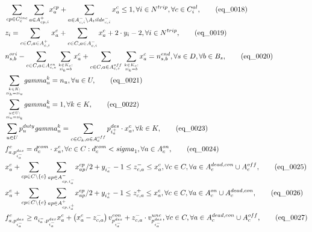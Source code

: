 \begin{align}
  & \sum_{cp \in C_{c}^{inc}} \underset{a \in A_{cp , i}^{+}}{\sum} x_{a}^{cp} + \sum_{a \in A_{c , i}^{-} \backslash A_tilde_{c , i}^{-}} x_{a}^{c} \leq 1 , \forall i \in N^{trip} , \forall c \in C_{i}^{al} , \tag{eq\_0018} \\
  & z_{i} = \sum_{c \in C, a \in A_{c , i}^{+}} x_{a}^{c} + \sum_{c \in C, a \in A_{c , i}^{-}} x_{a}^{c} + 2 \cdot y_{i} - 2 , \forall i \in N^{trip} , \tag{eq\_0019} \\
  & n_{s , b}^{ori} - \sum_{c \in C, a \in A_{c , s}^{on}} \underset{\genfrac{}{}{0pt}{}{k \in K_{c} :}{\mathit{xi}_{k} = b}}{\sum} x_{a}^{c} + \sum_{c \in C, a \in A_{c , s}^{off}} \underset{\genfrac{}{}{0pt}{}{k \in K_{c} :}{\mathit{xi}_{k} = b}}{\sum} x_{a}^{c} = n_{s , b}^{end} , \forall s \in D , \forall b \in B_{s} , \tag{eq\_0020} \\
  & \underset{\genfrac{}{}{0pt}{}{k \in K :}{\mathit{xi}_{k} = \mathit{xi}_{u}}}{\sum} \mathit{gamma}_{u}^{k} = n_{u} , \forall u \in U , \tag{eq\_0021} \\
  & \underset{\genfrac{}{}{0pt}{}{u \in U :}{\mathit{xi}_{u} = \mathit{xi}_{k}}}{\sum} \mathit{gamma}_{u}^{k} = 1 , \forall k \in K , \tag{eq\_0022} \\
  & \sum_{u \in U} p_{u}^{duty} \mathit{gamma}_{u}^{k} = \sum_{c \in C_{k}, a \in A_{c}^{off}} p_{i_{a}^{+}}^{des} \cdot x_{a}^{c} , \forall k \in K , \tag{eq\_0023} \\
  & f_{a , p_{i_{a}^{-}}^{des}}^{c} = d_{c}^{com} \cdot x_{a}^{c} , \forall c \in C : d_{c}^{com} < \mathit{sigma}_{1} , \forall a \in A_{c}^{on} , \tag{eq\_0024} \\
  & x_{a}^{c} + \sum_{cp \in C \backslash \left\{c\right\}} \underset{ap \in A_{cp , i_{a}^{-}}^{-}}{\sum} x_{ap}^{cp} / 2 + y_{i_{a}^{-}} - 1 \leq z_{c , a}^{-} \leq x_{a}^{c} , \forall c \in C , \forall a \in A_{c}^{dead,con} \cup A_{c}^{off} , \tag{eq\_0025} \\
  & x_{a}^{c} + \sum_{cp \in C \backslash \left\{c\right\}} \underset{ap \in A_{cp , i_{a}^{+}}^{+}}{\sum} x_{ap}^{cp} / 2 + y_{i_{a}^{+}} - 1 \leq z_{c , a}^{+} \leq x_{a}^{c} , \forall c \in C , \forall a \in A_{c}^{on} \cup A_{c}^{dead,con} , \tag{eq\_0026} \\
  & f_{a , p_{i_{a}^{-}}^{des}}^{c} \geq a_{i_{a}^{-} , p_{i_{a}^{-}}^{des}} x_{a}^{c} + \left(x_{a}^{c} - z_{c , a}^{-}\right) v_{p_{i_{a}^{-}}^{des}}^{con} + z_{c , a}^{-} \cdot v_{p_{i_{a}^{-}}^{des}}^{unc} , \forall c \in C , \forall a \in A_{c}^{dead , con} \cup A_{c}^{off} , \tag{eq\_0027} \\

\end{align}
